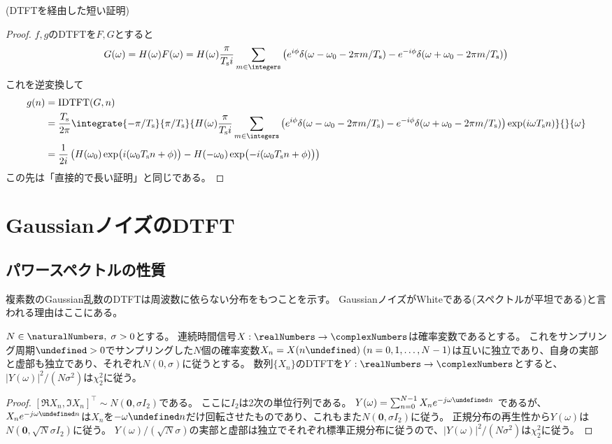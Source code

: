         (DTFTを経由した短い証明)
        \begin{proof}
            \quad\par
            $f,g$のDTFTを$F,G$とすると
            \[ G(\omega) = H(\omega)F(\omega) = H(\omega)\frac{\pi}{\Ts i}\sum_{m\in\integers}\left(e^{i\phi}\delta(\omega-\omega_0 - 2\pi m/\Ts) - e^{-i\phi}\delta(\omega+\omega_0 - 2\pi m/\Ts)\right) \]
            これを逆変換して
            \begin{align*}
                g(n) &= \text{IDTFT}(G,n) \\
                &= \frac{\Ts}{2\pi}\integrate{-\pi/\Ts}{\pi/\Ts}{H(\omega)\frac{\pi}{\Ts i}\sum_{m\in\integers}\left(e^{i\phi}\delta(\omega-\omega_0 - 2\pi m/\Ts) - e^{-i\phi}\delta(\omega+\omega_0 - 2\pi m/\Ts)\right)\exp(i\omega\Ts n)}{}{\omega} \\
                &= \frac{1}{2i}\left(H(\omega_0)\exp\bigl(i(\omega_0\Ts n+\phi)\bigr) - H(-\omega_0)\exp\bigl(-i(\omega_0\Ts n+\phi)\bigr)\right)
            \end{align*}
            この先は「直接的で長い証明」と同じである。
        \end{proof}
        \let\Ts\undefined
    \section{GaussianノイズのDTFT}
        \newcommand{\Ts}{T_\text{s}}
        \subsection{パワースペクトルの性質}
            \label{GaussianノイズのDTFTのパワースペクトル}
            複素数のGaussian乱数のDTFTは周波数に依らない分布をもつことを示す。
            GaussianノイズがWhiteである(スペクトルが平坦である)と言われる理由はここにある。
            \begin{shadebox}
                $N\in\naturalNumbers,\;\sigma>0$とする。
                連続時間信号$X:\realNumbers\to\complexNumbers$は確率変数であるとする。
                これをサンプリング周期$\Ts>0$でサンプリングした$N$個の確率変数$X_n = X(n\Ts)\;(n=0,1,\dots,N-1)$は互いに独立であり、自身の実部と虚部も独立であり、それぞれ$N(0,\sigma)$に従うとする。
                数列$\{X_n\}$のDTFTを$Y:\realNumbers\to\complexNumbers$とすると、$|Y(\omega)|^2/(N\sigma^2)$は$\chi_2^2$に従う。
            \end{shadebox}
            \begin{proof}
                \quad\par
                $[\Re{X_n}, \Im{X_n}]^\top \sim N(\bm{0}, \sigma I_2)$である。
                ここに$I_2$は2次の単位行列である。
                $Y(\omega) = \sum_{n=0}^{N-1} X_n e^{-j\omega\Ts n}$
                であるが、$X_n e^{-j\omega\Ts n}$は$X_n$を$-\omega\Ts n$だけ回転させたものであり、これもまた$N(\bm{0}, \sigma I_2)$に従う。
                正規分布の再生性から$Y(\omega)$は$N(\bm{0}, \sqrt{N}\sigma I_2)$に従う。
                $Y(\omega)/(\sqrt{N}\sigma)$の実部と虚部は独立でそれぞれ標準正規分布に従うので、$|Y(\omega)|^2/(N\sigma^2)$は$\chi_2^2$に従う。
            \end{proof}
